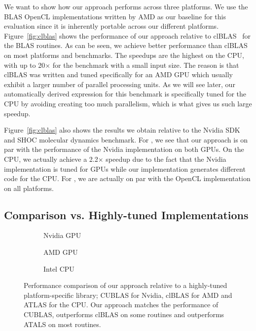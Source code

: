 We want to show how our approach performs across three platforms.
We use the BLAS OpenCL implementations written by AMD as our baseline for this evaluation since it is inherently portable across our different platforms.
Figure~\ref{fig:clblas} shows the performance of our approach relative to clBLAS~\cite{clBlas} for the BLAS routines. 
As can be seen, we achieve better performance than clBLAS on most platforms and benchmarks.
The speedups are the highest on the CPU, with up to 20$\times$ for the  benchmark with a small input size.
The reason is that clBLAS was written and tuned specifically for an AMD GPU which usually exhibit a larger number of parallel processing units.
As we will see later, our automatically derived expression for this benchmark is specifically tuned for the CPU by avoiding creating too much parallelism, which is what gives us such large speedup.

Figure~\ref{fig:clblas} also shows the results we obtain relative to the Nvidia SDK  and SHOC molecular dynamics  benchmark.
For , we see that our approach is on par with the performance of the Nvidia implementation on both GPUs.
On the CPU, we actually achieve a 2.2$\times$ speedup due to the fact that the Nvidia implementation is tuned for GPUs while our implementation generates different code for the CPU.
For , we are actually on par with the OpenCL implementation on all platforms.


\subsection{Comparison vs. Highly-tuned Implementations}

\begin{figure*}[t]
  \centering
  \begin{subfigure}[b]{0.315\linewidth}
    \caption{Nvidia GPU}
    \label{fig:results-nv}
  \end{subfigure}
  \hspace{0.015\linewidth}
  \begin{subfigure}[b]{0.315\linewidth}
    \caption{AMD GPU}
    \label{fig:results-amd}
  \end{subfigure}
  \hspace{0.015\linewidth}
  \begin{subfigure}[b]{0.315\linewidth}
    \caption{Intel CPU}
    \label{fig:results-cpu}
  \end{subfigure}
  \vspace{-1.5em}
  \caption{Performance comparison of our approach relative to a highly-tuned platform-specific library; CUBLAS for Nvidia, clBLAS for AMD and ATLAS for the CPU.	  
           Our approach matches the performance of CUBLAS, outperforms clBLAS on some routines and outperforms ATALS on most routines.}
   \label{fig:results}  
\end{figure*}

